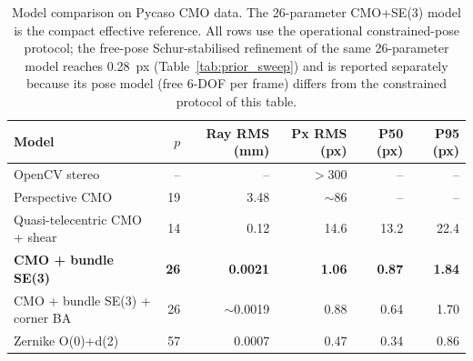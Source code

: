 \begin{table}[H]
\centering
\caption{Model comparison on Pycaso CMO data. The 26-parameter CMO+SE(3) model is the compact effective reference. All rows use the operational constrained-pose protocol; the free-pose Schur-stabilised refinement of the same 26-parameter model reaches \SI{0.28}{px} (Table~\ref{tab:prior_sweep}) and is reported separately because its pose model (free 6-DOF per frame) differs from the constrained protocol of this table.}
\label{tab:models}
\begin{tabular}{lrrrrr}
\toprule
Model & $p$ & Ray RMS (mm) & Px RMS (px) & P50 (px) & P95 (px) \\
\midrule
OpenCV stereo & -- & -- & $>300$ & -- & -- \\
Perspective CMO & 19 & 3.48 & $\sim$86 & -- & -- \\
Quasi-telecentric CMO + shear & 14 & 0.12 & 14.6 & 13.2 & 22.4 \\
\textbf{CMO + bundle SE(3)} & \textbf{26} & \textbf{0.0021} & \textbf{1.06} & \textbf{0.87} & \textbf{1.84} \\
CMO + bundle SE(3) + corner BA & 26 & $\sim$0.0019 & 0.88 & 0.64 & 1.70 \\
Zernike O(0)+d(2) & 57 & 0.0007 & 0.47 & 0.34 & 0.86 \\
\bottomrule
\end{tabular}
\end{table}
